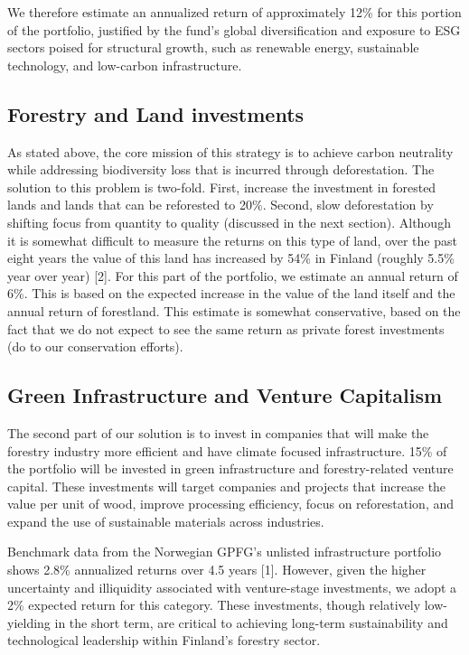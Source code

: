 \par We therefore estimate an annualized return of approximately 12\% for this portion of the portfolio, justified by the fund’s global diversification and exposure to ESG sectors poised for structural growth, such as renewable energy, sustainable technology, and low-carbon infrastructure.


\subsection{Forestry and Land investments}
As stated above, the core mission of this strategy is to achieve carbon neutrality while addressing biodiversity loss that is incurred through deforestation. The solution to this problem is two-fold. First, increase the investment in forested lands and lands that can be reforested to 20\%. Second, slow deforestation by shifting focus from quantity to quality (discussed in the next section). Although it is somewhat difficult to measure the returns on this type of land, over the past eight years the value of this land has increased by 54\% in Finland (roughly 5.5\% year over year) [2]. For this part of the portfolio, we estimate an annual return of 6\%. This is based on the expected increase in the value of the land itself and the annual return of forestland. This estimate is somewhat conservative, based on the fact that we do not expect to see the same return as private forest investments (do to our conservation efforts).

\subsection{Green Infrastructure and Venture Capitalism}
The second part of our solution is to invest in companies that will make the forestry industry more efficient and have climate focused infrastructure. 15\% of the portfolio will be invested in green infrastructure and forestry-related venture capital. These investments will target companies and projects that increase the value per unit of wood, improve processing efficiency, focus on reforestation, and expand the use of sustainable materials across industries.
\par Benchmark data from the Norwegian GPFG’s unlisted infrastructure portfolio shows 2.8\% annualized returns over 4.5 years [1]. However, given the higher uncertainty and illiquidity associated with venture-stage investments, we adopt a 2\% expected return for this category. These investments, though relatively low-yielding in the short term, are critical to achieving long-term sustainability and technological leadership within Finland’s forestry sector.


